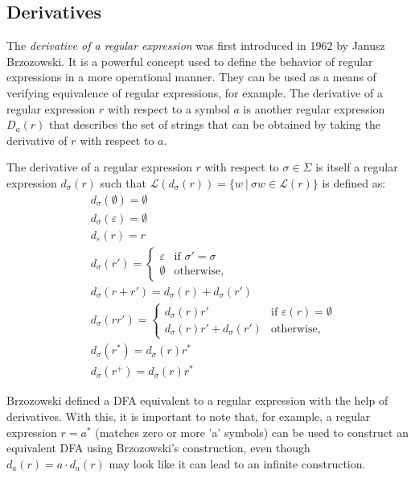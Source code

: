 \subsection{Derivatives}
\label{chap:prelim:derivatives}
The \emph{derivative of a regular expression} was first introduced in 1962 by Janusz Brzozowski. It is a powerful concept used to define the behavior of regular expressions in a more operational manner. They can be used as a means of verifying equivalence of regular expressions, for example. The derivative of a regular expression $r$ with respect to a symbol $a$ is another regular expression $D_a(r)$ that describes the set of strings that can be obtained by taking the derivative of $r$ with respect to $a$.

\begin{defn}
	The derivative of a regular expression $r$ with respect to $\sigma \in \Sigma$ is itself a regular expression $d_\sigma(r)$ such that $\mathcal{L}(d_\sigma(r)) = \{w \ \vert \ \sigma w \in \mathcal{L}(r)\}$ is defined as:
	\begin{align*}
		& d_\sigma(\emptyset) = \emptyset \\
		& d_\sigma(\varepsilon) = \emptyset \\
		& d_\varepsilon(r) = r \\
		& d_\sigma(r') = \begin{cases}
			\varepsilon & \text{if $\sigma' = \sigma$} \\
			\emptyset & \text{otherwise,}
		\end{cases} \\
		& d_\sigma(r+r') = d_\sigma(r)+d_\sigma(r') \\
		& d_\sigma(rr') = \begin{cases}
			d_\sigma(r)r' & \text{if $\varepsilon(r) = \emptyset$} \\
			d_\sigma(r)r' + d_\sigma(r') & \text{otherwise,}
		\end{cases} \\
		& d_\sigma(r^*) = d_\sigma(r)r^* \\
		& d_\sigma(r^+) = d_\sigma(r)r^*
	\end{align*}
\end{defn}


Brzozowski defined a DFA equivalent to a regular expression with the help of derivatives. With this, it is important to note that, for example, a regular expression $r = a^*$ (matches zero or more 'a' symbols) can be used to construct an equivalent DFA using Brzozowski's construction, even though $d_a(r) = a \cdot d_a(r)$ may look like it can lead to an infinite construction.

